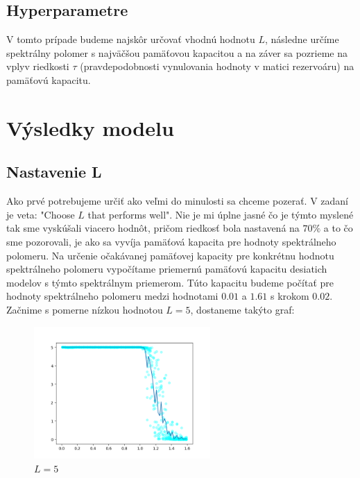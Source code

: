 \documentclass[a4paper]{article}
\begin{document}
	\subsection*{Hyperparametre}
	
	V tomto prípade budeme najskôr určovať vhodnú hodnotu $L$, následne určíme spektrálny polomer s najväčšou pamäťovou kapacitou a na záver sa pozrieme na vplyv riedkosti $\tau$ (pravdepodobnosti vynulovania hodnoty v matici rezervoáru) na pamäťovú kapacitu. 
	
	\section{Výsledky modelu}
	
	\subsection*{Nastavenie L}
	
	Ako prvé potrebujeme určiť ako veľmi do minulosti sa chceme pozerať. V zadaní je veta: "Choose $L$ that performs well". Nie je mi úplne jasné čo je týmto myslené tak sme vyskúšali viacero hodnôt, pričom riedkosť bola nastavená na $70\%$ a to čo sme pozorovali, je ako sa vyvíja pamäťová kapacita pre hodnoty spektrálneho polomeru. Na určenie očakávanej pamäťovej kapacity pre konkrétnu hodnotu spektrálneho polomeru vypočítame priemernú pamäťovú kapacitu desiatich modelov s týmto spektrálnym priemerom. Túto kapacitu budeme počítať pre hodnoty spektrálneho polomeru medzi hodnotami $0.01$ a $1.61$ s krokom $0.02$.
	\\
	
	Začnime s pomerne nízkou hodnotou $L=5$, dostaneme takýto graf:
	
	\begin{figure}[!h]
		\centering
		\includegraphics[width=0.6\textwidth]{../L_5.png}
		\caption{$L=5$}
	\end{figure}
	
\end{document}

